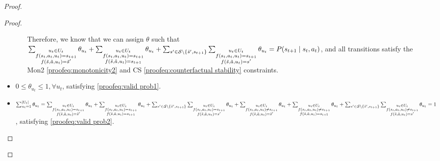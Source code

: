\begin{proof}
\begin{proof}
\begin{itemize}
\begin{itemize}
        Therefore, we know that we can assign $\theta$ such that $\sum_{\substack{u_t \in U_t \\f(s_t, a_t, u_t) = s_{t+1} \\ f(\tilde{s}, \tilde{a}, u_t) = \tilde{s}'}}{\theta_{u_t}} + \sum_{\substack{u_t \in U_t \\f(s_t, a_t, u_t) = s_{t+1} \\ f(\tilde{s}, \tilde{a}, u_t) = s_{t+1}}}{\theta_{u_t}} \\+ \sum_{s' \in \mathcal{S}\setminus\{\tilde{s}', s_{t+1}\}}\sum_{\substack{u_t \in U_t \\f(s_t, a_t, u_t) = s_{t+1} \\ f(\tilde{s}, \tilde{a}, u_t) = s'}}{\theta_{u_t}} = P(s_{t+1} \mid s_t, a_t)$, and all transitions satisfy the Mon2 \eqref{proofeq:monotonicity2} and CS \eqref{proofeq:counterfactual stability} constraints.

        \end{itemize}
    
    \item $0 \leq \theta_{u_t} \leq 1, \forall u_t$, satisfying \eqref{proofeq:valid prob1}.
    
    \item $\sum_{u_t = 1}^{|U_t|} \theta_{u_t} = \sum_{\substack{u_t \in U_t \\f(s_t, a_t, u_t) = s_{t+1} \\ f(\tilde{s}, \tilde{a}, u_t) = \tilde{s}'}} \theta_{u_t} + \sum_{\substack{u_t \in U_t \\f(s_t, a_t, u_t) = s_{t+1} \\ f(\tilde{s}, \tilde{a}, u_t) = s_{t+1}}} \theta_{u_t} +  \sum_{s' \in \mathcal{S}\setminus\{\tilde{s}', s_{t+1}\}}\sum_{\substack{u_t \in U_t \\f(s_t, a_t, u_t) = s_{t+1} \\ f(\tilde{s}, \tilde{a}, u_t) = s'}}{\theta_{u_t}} \\+ \sum_{\substack{u_t \in U_t \\f(s_t, a_t, u_t) \neq s_{t+1} \\ f(\tilde{s}, \tilde{a}, u_t) = \tilde{s}'}} \theta_{u_t} + \sum_{\substack{u_t \in U_t \\f(s_t, a_t, u_t) \neq s_{t+1} \\ f(\tilde{s}, \tilde{a}, u_t) = s_{t+1}}} \theta_{u_t} + \sum_{s' \in \mathcal{S}\setminus\{\tilde{s}', s_{t+1}\}}\sum_{\substack{u_t \in U_t \\f(s_t, a_t, u_t) \neq s_{t+1} \\ f(\tilde{s}, \tilde{a}, u_t) = s'}}{\theta_{u_t}} = 1$, satisfying \eqref{proofeq:valid prob2}.
\end{itemize}


\end{proof}
\end{proof}
